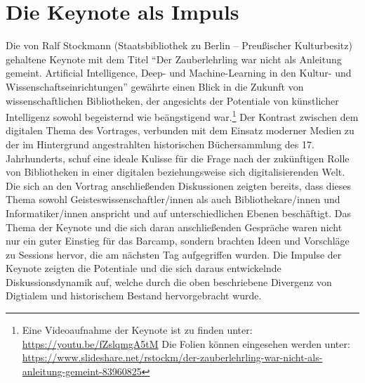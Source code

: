 \documentclass[a4paper,
fontsize=11pt,
oneside,
numbers=noperiodatend,
parskip=half-,
bibliography=totoc,
final
]{scrartcl}
\begin{document}
\hypertarget{die-keynote-als-impuls}{%
\section{Die Keynote als Impuls}\label{die-keynote-als-impuls}}

Die von Ralf Stockmann (Staatsbibliothek zu Berlin -- Preußischer
Kulturbesitz) gehaltene Keynote mit dem Titel \enquote{Der
Zauberlehrling war nicht als Anleitung gemeint. Artificial Intelligence,
Deep- und Machine-Learning in den Kultur- und
Wissenschaftseinrichtungen} gewährte einen Blick in die Zukunft von
wissenschaftlichen Bibliotheken, der angesichts der Potentiale von
künstlicher Intelligenz sowohl begeisternd wie beängstigend
war.\footnote{Eine Videoaufnahme der Keynote ist zu finden unter:
  \url{https://youtu.be/fZslqmgA5tM} Die Folien können eingesehen werden
  unter:
  \url{https://www.slideshare.net/rstockm/der-zauberlehrling-war-nicht-als-anleitung-gemeint-83960825}}
Der Kontrast zwischen dem digitalen Thema des Vortrages, verbunden mit
dem Einsatz moderner Medien zu der im Hintergrund angestrahlten
historischen Büchersammlung des 17. Jahrhunderts, schuf eine ideale
Kulisse für die Frage nach der zukünftigen Rolle von Bibliotheken in
einer digitalen beziehungsweise sich digitalisierenden Welt. Die sich an
den Vortrag anschließenden Diskussionen zeigten bereits, dass dieses
Thema sowohl Geisteswissenschaftler/innen als auch Bibliothekare/innen
und Informatiker/innen anspricht und auf unterschiedlichen Ebenen
beschäftigt. Das Thema der Keynote und die sich daran anschließenden
Gespräche waren nicht nur ein guter Einstieg für das Barcamp, sondern
brachten Ideen und Vorschläge zu Sessions hervor, die am nächsten Tag
aufgegriffen wurden. Die Impulse der Keynote zeigten die Potentiale und
die sich daraus entwickelnde Diskussionsdynamik auf, welche durch die
oben beschriebene Divergenz von Digtialem und historischem Bestand
hervorgebracht wurde.
\end{document}
